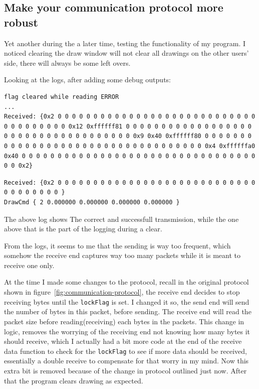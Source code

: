 \documentclass[11pt]{article}
\begin{document}
\begin{multicols*}{2}
\subsection{Make your communication protocol more robust}

Yet another during the a later time, testing the functionality of my program. I noticed clearing the draw window will not clear all drawings on the other users' side, there will always be some left overs.

Looking at the logs, after adding some debug outputs:

\begin{lstlisting}[caption={output log with error}]
flag cleared while reading ERROR
...
Received: {0x2 0 0 0 0 0 0 0 0 0 0 0 0 0 0 0 0 0 0 0 0 0 0 0 0 0 0 0 0 0 0 0 0 0 0 0 0 0 0x12 0xffffff81 0 0 0 0 0 0 0 0 0 0 0 0 0 0 0 0 0 0 0 0 0 0 0 0 0 0 0 0 0 0 0 0 0 0 0 0 0x9 0x40 0xffffff80 0 0 0 0 0 0 0 0 0 0 0 0 0 0 0 0 0 0 0 0 0 0 0 0 0 0 0 0 0 0 0 0 0 0 0 0x4 0xffffffa0 0x40 0 0 0 0 0 0 0 0 0 0 0 0 0 0 0 0 0 0 0 0 0 0 0 0 0 0 0 0 0 0 0 0 0 0 0 0x2}
\end{lstlisting}

\begin{lstlisting}[caption={Correct output log}]
Received: {0x2 0 0 0 0 0 0 0 0 0 0 0 0 0 0 0 0 0 0 0 0 0 0 0 0 0 0 0 0 0 0 0 0 0 0 0 0 }
DrawCmd { 2 0.000000 0.000000 0.000000 0.000000 }
\end{lstlisting}

The above log shows The correct and successfull transmission, while the one above that is the part of the logging during a clear.

From the logs, it seems to me that the sending is way too frequent, which somehow the receive end captures way too many packets while it is meant to receive one only.

At the time I made some changes to the protocol, recall in the original protocol shown in figure~\ref{fig:communication-protocol}, the receive end decides to stop receiving bytes until the \verb|lockFlag| is set. I changed it so, the send end will send the number of bytes in this packet, before sending. The receive end will read the packet size before reading(receiving) each bytes in the packets. This change in logic, removes the worrying of the receiving end not knowing how many bytes it should receive, which I actually had a bit more code at the end of the receive data function to check for the \verb|lockFlag| to see if more data should be received, essentially a double receive to compensate for that worry in my mind. Now this extra bit is removed because of the change in protocol outlined just now. After that the program clears drawing as expected.

\end{multicols*}
\end{document}
